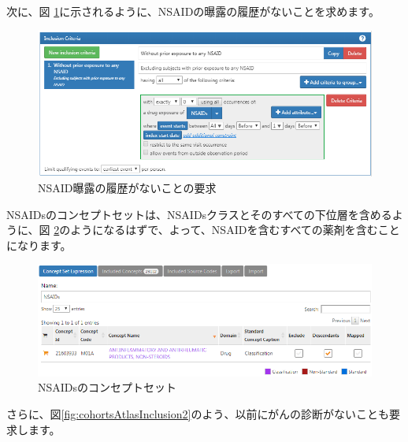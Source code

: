 \documentclass[
  11pt]{book}
\theoremstyle{definition}
\theoremstyle{definition}
\theoremstyle{definition}
\theoremstyle{definition}
\theoremstyle{remark}
\begin{document}
次に、図 \ref{fig:cohortsAtlasInclusion1}に示されるように、NSAIDの曝露の履歴がないことを求めます。

\begin{figure}

{\centering \includegraphics[width=1\linewidth]{images/SuggestedAnswers/cohortsAtlasInclusion1} 

}

\caption{NSAID曝露の履歴がないことの要求}\label{fig:cohortsAtlasInclusion1}
\end{figure}

NSAIDsのコンセプトセットは、NSAIDsクラスとそのすべての下位層を含めるように、図 \ref{fig:cohortsAtlasConceptSet2}のようになるはずで、よって、NSAIDを含むすべての薬剤を含むことになります。

\begin{figure}

{\centering \includegraphics[width=1\linewidth]{images/SuggestedAnswers/cohortsAtlasConceptSet2} 

}

\caption{NSAIDsのコンセプトセット}\label{fig:cohortsAtlasConceptSet2}
\end{figure}

さらに、図\ref{fig:cohortsAtlasInclusion2}のよう、以前にがんの診断がないことも要求します。
\end{document}

